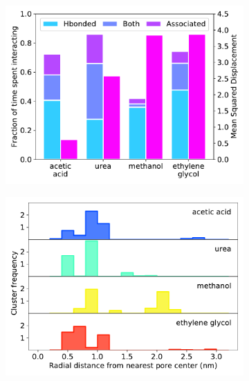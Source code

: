 \documentclass{article}
\begin{document}
  \begin{figure}
  \centering
  \begin{subfigure}{0.45\textwidth}
  \includegraphics[width=\textwidth]{hbonds_assoc_summary.pdf}
  \caption{}\label{fig:hbonds_assoc_summary}
  \end{subfigure}
  \begin{subfigure}{0.45\textwidth}
  \includegraphics[width=\textwidth]{rdf_summary.pdf}
  \caption{}\label{fig:rdf_summary}
  \end{subfigure}
  \begin{subfigure}{0.45\textwidth}

\end{subfigure}
\end{figure}
\end{document}
